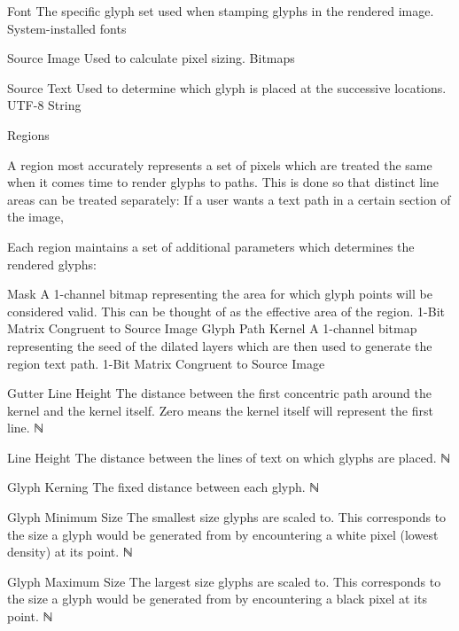\begin{itemize}
  \paritem
  {Font}
  {The specific glyph set used when stamping glyphs in the rendered image.  }
  {System-installed fonts}
  {\FontParSymbol}

  \paritem
  {Source Image}
  {Used to calculate pixel sizing.}
  {Bitmaps}
  {\SrcImgParSymbol}

  \paritem
  {Source Text}
  {Used to determine which glyph is placed at the successive locations.}
  {UTF-8 String}
  {\SrcTxtParSymbol}

  \pbodyitem
  {Regions}
  {
    A region most accurately represents a set of pixels which are treated the same when it comes time to render glyphs to paths.
    This is done so that distinct line areas can be treated separately:  If a user wants a text path in a certain section of the image,

    Each region maintains a set of additional parameters which determines the rendered glyphs:
    \begin{itemize}
      \paritem
      {Mask}
      {A 1-channel bitmap representing the area for which glyph points will be considered valid.
        This can be thought of as the effective area of the region.}
      {1-Bit Matrix Congruent to Source Image}
      {\RegMskParSymbol}
      \paritem
      {Glyph Path Kernel}
      {A 1-channel bitmap representing the seed of the dilated layers which are then used to generate the region text path.}
      {1-Bit Matrix Congruent to Source Image}
      {\GlyphPathKernelParSymbol}

      \paritem
      {Gutter Line Height}
      {The distance between the first concentric path around the kernel and the kernel itself.
        Zero means the kernel itself will represent the first line.}
      {ℕ}
      {\GtrHtParSymbol}

      \paritem
      {Line Height}
      {The distance between the lines of text on which glyphs are placed.}
      {ℕ}
      {\LnHtParSymbol}

      \paritem
      {Glyph Kerning}
      {The fixed distance between each glyph.}
      {ℕ}
      {\GlyphKrnParSymbol}

      \paritem
      {Glyph Minimum Size}
      {The smallest size glyphs are scaled to.
        This corresponds to the size a glyph would be generated from by encountering a white pixel (lowest density) at its point.}
      {ℕ}
      {\GlyphSzMinParSymbol}

      \paritem
      {Glyph Maximum Size}
      {The largest size glyphs are scaled to.
        This corresponds to the size a glyph would be generated from by encountering a black pixel at its point.
      }
      {ℕ}
      {\GlyphSzMaxParSymbol}


\end{itemize}}
\end{itemize}
